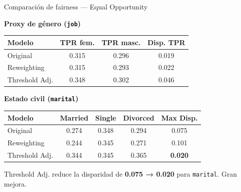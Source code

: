 \documentclass[aspectratio=169, 11pt]{beamer}
\begin{document}
\begin{frame}{Comparación de fairness — Equal Opportunity}
\begin{center}
\textbf{Proxy de género (\texttt{job})}\\[4pt]
\begin{tabular}{l c c c}
\toprule
\textbf{Modelo} & \textbf{TPR fem.} & \textbf{TPR masc.} & \textbf{Disp. TPR} \\
\midrule
\rowcolor{gris10} Original & 0.315 & 0.296 & 0.019 \\
Reweighting & 0.315 & 0.293 & 0.022 \\
\rowcolor{gris10} Threshold Adj. & 0.348 & 0.302 & 0.046 \\
\bottomrule
\end{tabular}
\end{center}
\vspace{8pt}
\begin{center}
\textbf{Estado civil (\texttt{marital})}\\[4pt]
\begin{tabular}{l c c c c}
\toprule
\textbf{Modelo} & \textbf{Married} & \textbf{Single} & \textbf{Divorced} & \textbf{Max Disp.} \\
\midrule
\rowcolor{gris10} Original & 0.274 & 0.348 & 0.294 & 0.075 \\
Reweighting & 0.244 & 0.345 & 0.271 & 0.101 \\
\rowcolor{gris10} Threshold Adj. & 0.344 & 0.345 & 0.365 & \textbf{0.020} \\
\bottomrule
\end{tabular}
\end{center}
\vspace{4pt}
{\small Threshold Adj. reduce la disparidad de \textbf{0.075 → 0.020} para \texttt{marital}. Gran mejora.}
\end{frame}
\end{document}
